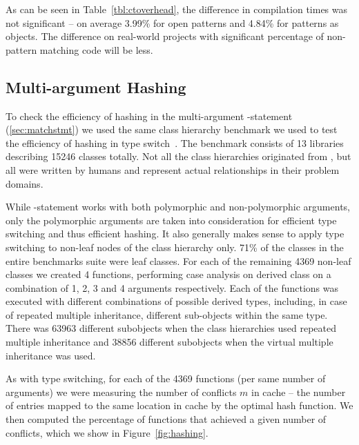 As can be seen in Table~\ref{tbl:ctoverhead},  the difference in compilation times was not significant -- on 
average 3.99\% for open patterns and 4.84\% for patterns as objects. The difference on real-world projects with significant 
percentage of non-pattern matching code will be less.

\subsection{Multi-argument Hashing}
\label{sec:morton}

To check the efficiency of hashing in the multi-argument -statement 
(\textsection\ref{sec:matchstmt}) we used the same class hierarchy benchmark we 
used to test the efficiency of hashing in type switch~\cite[]{TS12}.
The benchmark consists of 13 libraries describing 15246 classes totally. Not all 
the class hierarchies originated from \Cpp{}, but all were written by humans and 
represent actual relationships in their problem domains.

While -statement works with both polymorphic and non-polymorphic 
arguments, only the polymorphic arguments are taken into consideration for 
efficient type switching and thus efficient hashing. It also generally makes 
sense to apply type switching to non-leaf nodes of the class hierarchy only. 71\%
of the classes in the entire benchmarks suite were leaf classes. For each of the 
remaining 4369 non-leaf classes we created 4 functions, performing case analysis 
on derived class on a combination of 1, 2, 3 and 4 arguments respectively. Each 
of the functions was executed with different combinations of possible derived 
types, including, in case of repeated multiple inheritance, different 
sub-objects within the same type. There was 63963 different subobjects when the 
class hierarchies used repeated multiple inheritance and 38856 different 
subobjects when the virtual multiple inheritance was used.

As with type switching, for each of the 4369 functions (per same number of 
arguments) we were measuring the number of conflicts $m$ in cache -- the number 
of entries mapped to the same location in cache by the optimal hash function. 
We then computed the percentage of functions that achieved a given number of 
conflicts, which we show in Figure~\ref{fig:hashing}.


